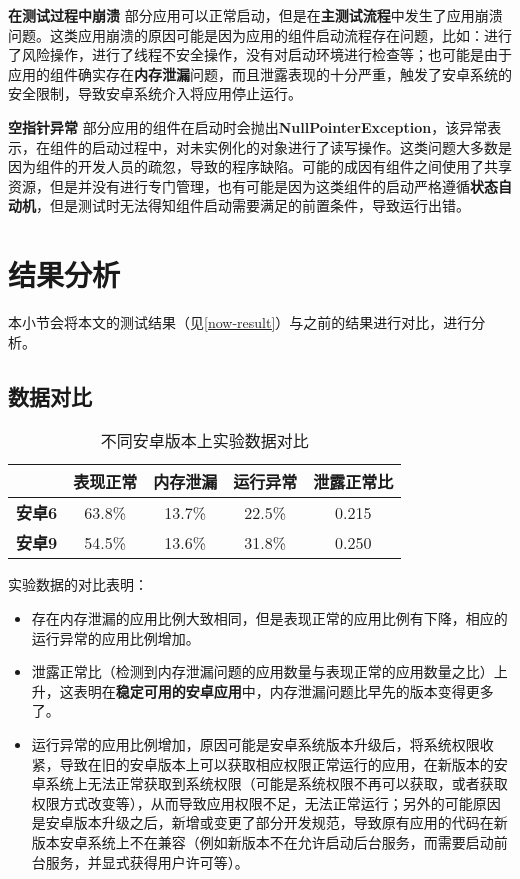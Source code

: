 \textbf{在测试过程中崩溃 } 部分应用可以正常启动，但是在\textbf{主测试流程}中发生了应用崩溃问题。这类应用崩溃的原因可能是因为应用的组件启动流程存在问题，比如：进行了风险操作，进行了线程不安全操作，没有对启动环境进行检查等；也可能是由于应用的组件确实存在\textbf{内存泄漏}问题，而且泄露表现的十分严重，触发了安卓系统的安全限制，导致安卓系统介入将应用停止运行。

\textbf{空指针异常 } 部分应用的组件在启动时会抛出\textbf{NullPointerException}，该异常表示，在组件的启动过程中，对未实例化的对象进行了读写操作。这类问题大多数是因为组件的开发人员的疏忽，导致的程序缺陷。可能的成因有组件之间使用了共享资源，但是并没有进行专门管理，也有可能是因为这类组件的启动严格遵循\textbf{状态自动机}，但是测试时无法得知组件启动需要满足的前置条件，导致运行出错。

\section{结果分析}

本小节会将本文的测试结果（见\ref{now-result}）与之前的结果\cite{jun2018lesdroid}进行对比，进行分析。

\subsection{数据对比}
\begin{table}[htb]\footnotesize
	\centering
	\caption{不同安卓版本上实验数据对比}
	\vspace{2mm}
	\begin{tabular}{lcccc}
		\toprule
		&\textbf{表现正常}&\textbf{内存泄漏}&\textbf{运行异常}&\textbf{泄露正常比}\\
		\midrule
		\textbf{安卓6}&63.8\%&13.7\%&22.5\%&0.215\\
		\hline
		\textbf{安卓9}&54.5\%&13.6\%&31.8\%&0.250\\
		\bottomrule
	\end{tabular}
	\label{table:compare}
\end{table}

实验数据的对比表明：
\begin{itemize}
	\item 存在内存泄漏的应用比例大致相同，但是表现正常的应用比例有下降，相应的运行异常的应用比例增加。
	\item 泄露正常比（检测到内存泄漏问题的应用数量与表现正常的应用数量之比）上升，这表明在\textbf{稳定可用的安卓应用}中，内存泄漏问题比早先的版本变得更多了。
	\item 运行异常的应用比例增加，原因可能是安卓系统版本升级后，将系统权限收紧，导致在旧的安卓版本上可以获取相应权限正常运行的应用，在新版本的安卓系统上无法正常获取到系统权限（可能是系统权限不再可以获取，或者获取权限方式改变等），从而导致应用权限不足，无法正常运行；另外的可能原因是安卓版本升级之后，新增或变更了部分开发规范，导致原有应用的代码在新版本安卓系统上不在兼容（例如新版本不在允许启动后台服务，而需要启动前台服务，并显式获得用户许可等）。
\end{itemize}

